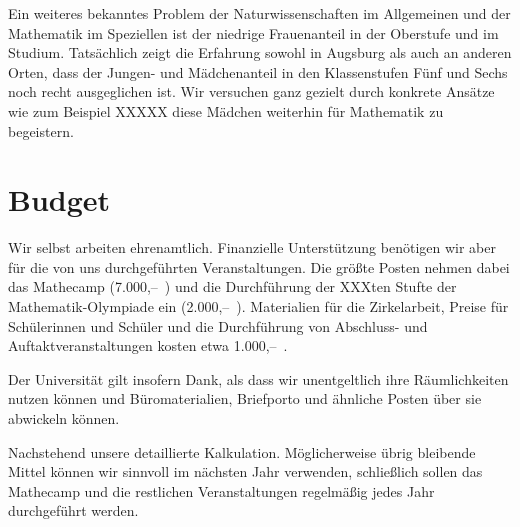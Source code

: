 \documentclass[12pt]{zettel}
\begin{document}
Ein weiteres bekanntes Problem der Naturwissenschaften im Allgemeinen
und der Mathematik im Speziellen ist der niedrige Frauenanteil in der
Oberstufe und im Studium. Tatsächlich zeigt die Erfahrung sowohl in
Augsburg als auch an anderen Orten, dass der Jungen- und Mädchenanteil
in den Klassenstufen Fünf und Sechs noch recht ausgeglichen ist. Wir
versuchen ganz gezielt durch konkrete Ansätze wie zum Beispiel XXXXX
diese Mädchen weiterhin für Mathematik zu begeistern.


\section{Budget}

Wir selbst arbeiten ehrenamtlich. Finanzielle Unterstützung benötigen wir aber
für die von uns durchgeführten Veranstaltungen. Die größte Posten nehmen dabei das
Mathecamp (7.000,--~\texteuro) und die Durchführung der XXXten Stufte der
Mathematik-Olympiade ein (2.000,--~\texteuro). Materialien für die
Zirkelarbeit, Preise für Schülerinnen und Schüler und die Durchführung von
Abschluss- und Auftaktveranstaltungen kosten etwa 1.000,--~\texteuro.

Der Universität gilt insofern Dank, als dass wir unentgeltlich ihre
Räumlichkeiten nutzen können und Büromaterialien, Briefporto und ähnliche
Posten über sie abwickeln können.

Nachstehend unsere detaillierte Kalkulation. Möglicherweise übrig bleibende
Mittel können wir sinnvoll im nächsten Jahr verwenden, schließlich sollen das
Mathecamp und die restlichen Veranstaltungen regelmäßig jedes Jahr durchgeführt
werden.
\end{document}
